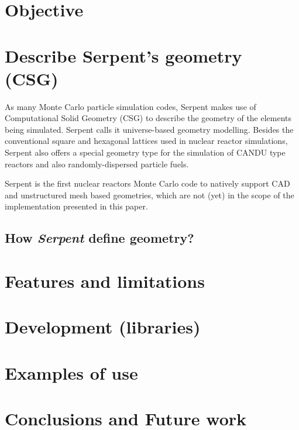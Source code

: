 \documentclass{elsarticle}
\begin{document}
\section{Objective}


\section{Describe Serpent's geometry (CSG)}

As many Monte Carlo particle simulation codes, Serpent makes use of Computational Solid Geometry (CSG) to
describe the geometry of the elements being simulated. Serpent calls it universe-based geometry modelling.
Besides the conventional square and hexagonal lattices used in nuclear reactor simulations, Serpent also
offers a special geometry type for the simulation of CANDU type reactors and also randomly-dispersed
particle fuels.

Serpent is the first nuclear reactors Monte Carlo code to natively support CAD and unstructured
mesh based geometries\cite{serpent-openfoam-mesh}, which are not (yet) in the scope of the implementation presented in this paper.

\subsection{How \textit{Serpent} define geometry?}


\section{Features and limitations}

\section{Development (libraries)}

\section{Examples of use}

\section{Conclusions and Future work}



\end{document}
